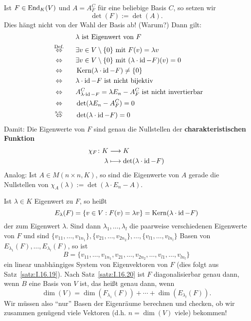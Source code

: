 Ist $F \in \operatorname{End}_K(V)$ und $A = A_F^C$ für eine beliebige Basis $C$, so setzen wir
\[
	\det(F) := \det(A).
\]
Dies hängt nicht von der Wahl der Basis ab! (Warum?)
Dann gilt:
\begin{align*}
	&\lambda \text{ ist Eigenwert von } F \\
\stack{\text{Def.}}{\Leftrightarrow} \quad &\exists v \in V \setminus \setzero \text{ mit } F(v) = \lambda v \\
\stack{}{\Leftrightarrow} \quad &\exists v \in V \setminus \setzero \text{ mit } (\lambda \cdot \id - F)(v) = 0 \\
\stack{}{\Leftrightarrow} \quad &\Kern(\lambda \cdot \id - F) \neq \setzero \\
\stack{}{\Leftrightarrow} \quad &\lambda \cdot \id-F \text{ ist nicht bijektiv} \\
\stack{}{\Leftrightarrow} \quad &A^C_{\lambda \cdot \id-F} = \lambda E_n - A_F^C \text{ ist nicht invertierbar} \\
\stack{}{\Leftrightarrow} \quad &\det(\lambda E_n - A_F^C) = 0 \\
\stack{\text{s.o.}}{\Leftrightarrow} \quad &\det(\lambda \cdot \id - F) = 0
\end{align*}
Damit: Die Eigenwerte von $F$ sind genau die Nullstellen der \textbf{charakteristischen Funktion} 
\begin{align*}
	\chi_F \colon K &\longrightarrow K \\
	\lambda &\longmapsto \det(\lambda \cdot \operatorname{id} - F)
\end{align*}
Analog: Ist $A \in M(n \times n,K)$, so sind die Eigenwerte von $A$ gerade die Nullstellen von $\chi_A(\lambda) := \det(\lambda \cdot E_n - A)$.

Ist $\lambda \in K$ Eigenwert zu $F$, so heißt
\[
	E_\lambda(F) = \{v \in V : F(v) = \lambda v\} = \operatorname{Kern}(\lambda \cdot \operatorname{id} - F)
\]
der  zum Eigenwert $\lambda$.
Sind dann $\lambda_1,\dots,\lambda_l$ die paarweise verschiedenen Eigenwerte von $F$ und sind $\{v_{11},\dots,v_{1n_1}\}, \{v_{21},\dots,v_{2n_2}\}, \dots, \{v_{l1},\dots,v_{ln_l}\}$ Basen von $E_{\lambda_1}(F), \dots, E_{\lambda_l}(F)$, so ist
\[
	B = \{v_{11},\dots,v_{1n_1},v_{21},\dots,v_{2n_2},\dots,v_{l1},\dots,v_{ln_l}\}
\]
ein linear unabhängiges System von Eigenvektoren von $F$ (dies folgt aus Satz~\ref{satz:I.16.19}).
Nach Satz~\ref{satz:I.16.20} ist $F$ diagonalisierbar genau dann, wenn $B$ eine Basis von $V$ ist, das heißt genau dann, wenn
\[
	\dim(V) = \dim(F_{\lambda_1}(F)) + \cdots + \dim(E_{\lambda_l}(F)).
\]
Wir müssen also \enquote{nur} Basen der Eigenräume berechnen und checken, ob wir zusammen genügend viele Vektoren (d.h. $n = \dim(V)$ viele) bekommen!

